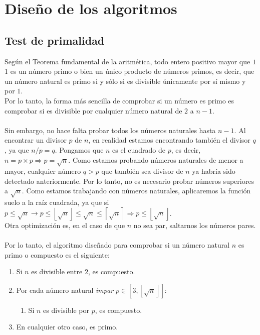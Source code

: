 \section{Diseño de los algoritmos}
\subsection{Test de primalidad}
Según el Teorema fundamental de la aritmética, todo entero positivo mayor que $1$1 es un número primo o bien un único producto de números primos, es decir, que un número natural es primo si y sólo si es divisible únicamente por sí mismo y por $1$.\\
Por lo tanto, la forma más sencilla de comprobar si un número es primo es comprobar si es divisible por cualquier número natural de $2$ a $n-1$.\\
\\
Sin embargo, no hace falta probar todos los números naturales hasta $n-1$. Al encontrar un divisor $p$ de $n$, en realidad estamos encontrando también el divisor $q$, ya que $n / p = q$. Pongamos que $n$ es el cuadrado de $p$, es decir, $n = p \times p \Rightarrow p = \sqrt{n}$. Como estamos probando números naturales de menor a mayor, cualquier número $q > p$ que también sea divisor de $n$ ya habría sido detectado anteriormente. Por lo tanto, no es necesario probar números superiores a $\sqrt{n}$. Como estamos trabajando con números naturales, aplicaremos la función suelo a la raíz cuadrada, ya que si $p \leq \sqrt{n} \rightarrow p \leq \left \lfloor \sqrt{n} \right \rfloor \leq \sqrt{n} \leq \left \lceil \sqrt{n} \right \rceil \Rightarrow p \leq \left \lfloor \sqrt{n} \right \rfloor$.\\
Otra optimización es, en el caso de que $n$ no sea par, saltarnos los números pares.\\
\\
Por lo tanto, el algoritmo diseñado para comprobar si un número natural $n$ es primo o compuesto es el siguiente:
\begin{enumerate}
    \item Si $n$ es divisible entre $2$, es compuesto.
    \item Por cada número natural \textit{impar} $p \in [3, \left \lfloor \sqrt{n} \right \rfloor]$:
    \begin{enumerate}
        \item Si $n$ es divisible por $p$, es compuesto.
    \end{enumerate}
    \item En cualquier otro caso, es primo.
\end{enumerate}


